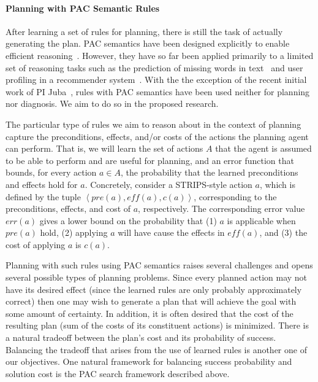 \documentclass[12pt]{article}
\newcommand{\note}[1]{\textbf{\textit{#1}}}
\newcommand{\tuple}[1]{\ensuremath{\left \langle #1 \right \rangle }}
\newcommand{\eff}{\textit{eff}}
\newcommand{\pre}{\textit{pre}}
\begin{document}
\paragraph{Planning with PAC Semantic Rules}


After learning a set of rules for planning, there is still the task of actually generating the plan. PAC semantics have been designed explicitly to enable efficient reasoning~\cite{valiant2000robustLogics}. However, they have so far been applied primarily to a limited set of reasoning tasks such as the prediction of missing words in text~\cite{michael2008first} and user profiling in a recommender system~\cite{semeraro2009knowledge}. With the the exception of the recent initial work of PI Juba~\cite{juba2016aaai,juba2016jmlr}, rules with PAC semantics have been used neither for planning nor diagnosis. We aim to do so in the proposed research. 



The particular type of rules we aim to reason about in the context of planning capture the preconditions, effects, and/or costs of the actions the planning agent can perform. 
That is, we will learn the set of actions $A$ that the agent is assumed to be able to perform and are useful for planning, 
and an error function that bounds, for every action $a\in A$, 
the probability that the learned preconditions and effects hold for $a$.
Concretely, consider a STRIPS-style action $a$, which is defined by the tuple $\tuple{\pre(a), \eff(a), c(a)}$, corresponding to the preconditions, effects, and cost of $a$, respectively. The corresponding error value $err(a)$ gives a lower bound on the probability that (1) $a$ is applicable when $\pre(a)$ hold, (2) applying $a$ will have cause the effects in $\eff(a)$, and (3) the cost of applying $a$ is $c(a)$. 



Planning with such rules using PAC semantics raises several challenges and opens several possible types of planning problems.
Since every planned action may not have its desired effect (since the learned rules are only probably approximately correct)
then one may wish to generate a plan that will achieve the goal with some amount of certainty. In addition, it is often desired that the cost of the resulting plan (sum of the costs of its constituent actions) is minimized. There is a natural tradeoff between the plan's cost  and its probability of success. 
Balancing the tradeoff that arises from the use of learned rules is another one of our objectives. One natural framework for balancing success probability and solution cost is the PAC search framework described above. 
 
\end{document}
